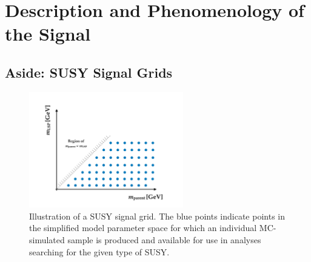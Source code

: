 \section{Description and Phenomenology of the Signal}
\label{sec:stop_pheno}


\subsection{Aside: SUSY Signal Grids}
\label{sec:susy_signal_grid}

\begin{figure}[!htb]
    \begin{center}
        \includegraphics[width=0.6\textwidth]{figures/search_stop2l/signal/susy_signal_grid_example}
        \caption{
            Illustration of a SUSY signal grid.
            The blue points indicate points in the simplified model parameter space for which
            an individual MC-simulated sample is produced and available for use in analyses
            searching for the given type of SUSY.
        }
        \label{fig:susy_signal_grid}
    \end{center}
\end{figure}

